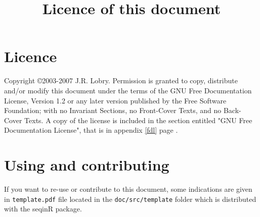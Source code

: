 \title{Licence of this document}
\section*{Licence}

    Copyright \copyright  2003-2007  J.R. Lobry.
    Permission is granted to copy, distribute and/or modify this document
    under the terms of the GNU Free Documentation License, Version 1.2
    or any later version published by the Free Software Foundation;
    with no Invariant Sections, no Front-Cover Texts, and no Back-Cover Texts.
    A copy of the license is included in the section entitled "GNU
    Free Documentation License", that is in appendix \ref{fdl} page \pageref{fdl}.

\section*{Using and contributing}

If you want to re-use or contribute to this document, some indications are
given in \texttt{template.pdf} file located in the \texttt{doc/src/template}
folder which is distributed with the seqinR package.

